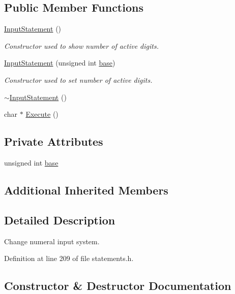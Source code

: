 \subsection*{Public Member Functions}
\begin{DoxyCompactItemize}
\item 
\hyperlink{classInputStatement_a93f36b9493387b157b38c44f54952eef}{Input\+Statement} ()
\begin{DoxyCompactList}\small\item\em Constructor used to show number of active digits. \end{DoxyCompactList}\item 
\hyperlink{classInputStatement_a3be3342d08524bb5e3c1caa197926d26}{Input\+Statement} (unsigned int \hyperlink{classInputStatement_aa36f7a6bcb8f164a2b6c910f7199fe9b}{base})
\begin{DoxyCompactList}\small\item\em Constructor used to set number of active digits. \end{DoxyCompactList}\item 
\hyperlink{classInputStatement_a4d473da78746be137aa960129f20c94b}{$\sim$\+Input\+Statement} ()
\item 
char $\ast$ \hyperlink{classInputStatement_ac4a9288ba2fe5002ae78d65c270222a5}{Execute} ()
\end{DoxyCompactItemize}
\subsection*{Private Attributes}
\begin{DoxyCompactItemize}
\item 
unsigned int \hyperlink{classInputStatement_aa36f7a6bcb8f164a2b6c910f7199fe9b}{base}
\end{DoxyCompactItemize}
\subsection*{Additional Inherited Members}


\subsection{Detailed Description}
Change numeral input system. 

Definition at line 209 of file statements.\+h.



\subsection{Constructor \& Destructor Documentation}
